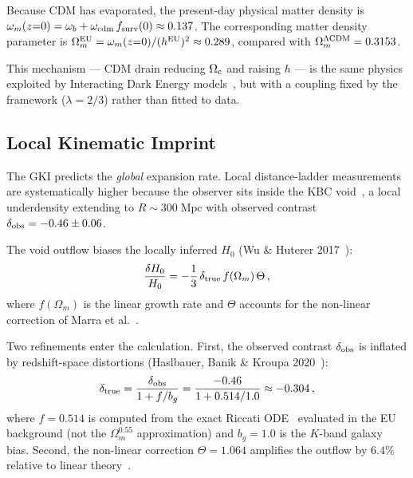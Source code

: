 \documentclass[a4paper,fleqn]{cas-dc}
\newcommand{\fsurv}{f_{\rm surv}}
\newcommand{\Ocdm}{\Omega_{\rm c}}
\begin{document}
Because CDM has evaporated, the present-day physical matter density
is $\omega_m(z{=}0) = \omega_b + \omega_{\rm cdm}\,\fsurv(0)
\approx 0.137$. The corresponding matter density parameter is
$\Omega_m^{\rm EU} = \omega_m(z{=}0) / (h^{\rm EU})^2 \approx 0.289$,
compared with $\Omega_m^{\Lambda\rm CDM} = 0.3153$.

This mechanism --- CDM drain reducing $\Ocdm$ and raising $h$ ---
is the same physics exploited by Interacting Dark Energy
models~\cite{divalentino2020}, but with a coupling
fixed by the framework ($\lambda = 2/3$) rather than
fitted to data.

\subsection{Local Kinematic Imprint}
\label{sec:lki}

The GKI predicts the \textit{global} expansion rate. Local
distance-ladder measurements are systematically higher because the
observer sits inside the KBC void~\cite{keenan2013}, a local
underdensity extending to $R \sim 300\;\text{Mpc}$ with observed
contrast $\delta_{\rm obs} = -0.46 \pm 0.06$.

The void outflow biases the locally inferred $H_0$
(Wu \& Huterer 2017~\cite{wu_huterer2017}):
\begin{equation}
\frac{\delta H_0}{H_0}
  = -\frac{1}{3}\,\delta_{\rm true}\,f(\Omega_m)\,\Theta\,,
\label{eq:void_bias}
\end{equation}
where $f(\Omega_m)$ is the linear growth rate and $\Theta$ accounts
for the non-linear correction of
Marra et al.~\cite{marra2013}.

Two refinements enter the calculation. First, the observed contrast
$\delta_{\rm obs}$ is inflated by redshift-space distortions
(Haslbauer, Banik \& Kroupa 2020~\cite{haslbauer2020}):
\begin{equation}
\delta_{\rm true}
  = \frac{\delta_{\rm obs}}{1 + f/b_g}
  = \frac{-0.46}{1 + 0.514/1.0}
  \approx -0.304\,,
\label{eq:delta_true}
\end{equation}
where $f = 0.514$ is computed from the exact Riccati
ODE~\cite{linder2005} evaluated in the EU background
(not the $\Omega_m^{0.55}$ approximation)
and $b_g = 1.0$ is the $K$-band galaxy bias. Second, the
non-linear correction $\Theta = 1.064$ amplifies the outflow by
$6.4\%$ relative to linear theory~\cite{marra2013}.
\end{document}
